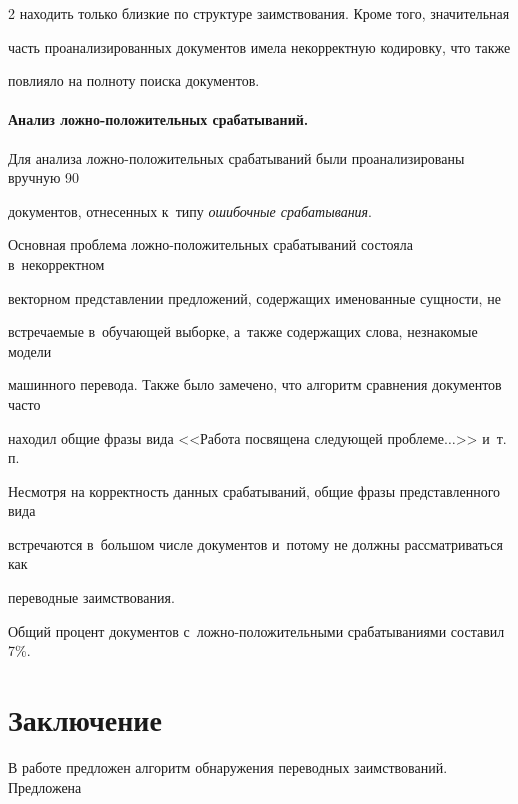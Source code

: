 \begin{multicols}{2}
находить только близкие по структуре заимствования. Кроме того, значительная 


часть проанализированных документов имела некорректную кодировку, что также 


повлияло на полноту поиска документов.





\vspace*{-12pt}





\paragraph*{Анализ лож\-но-по\-ло\-жи\-тель\-ных срабатываний.}


Для анализа лож\-но-по\-ло\-жи\-тель\-ных срабатываний были проанализированы вручную 90 


документов, отнесенных к~типу \textit{ошибочные срабатывания}.


\mbox{Основная} проблема лож\-но-по\-ло\-жи\-тель\-ных срабатываний со\-сто\-яла в~некорректном 


векторном представлении предложений, содержащих именованные сущ\-ности, не 


встре\-ча\-емые в~обуча\-ющей \mbox{выборке}, а~также содержащих слова, незнакомые модели 


машинного перевода. Также было замечено, что алгоритм сравнения документов час\-то 


находил общие фразы вида <<Работа посвящена сле\-ду\-ющей проб\-ле\-ме$\ldots$>> и~т.\,п. 


Несмотря на корректность данных срабатываний, общие фразы представленного вида 


встречаются в~большом числе документов и~потому не долж\-ны рассматриваться как 


переводные заимствования.


Общий процент документов с~ложно-положительными срабатываниями составил 7\%.





\section{Заключение}





В работе предложен алгоритм обнаружения переводных заимствований. Предложена 



\end{multicols}
